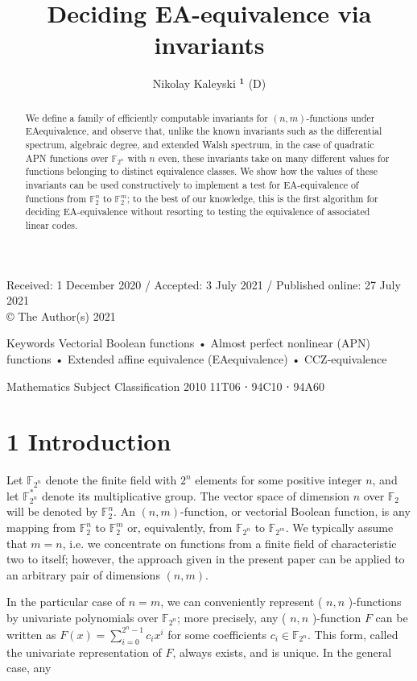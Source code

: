 \documentclass[10pt]{article}
\title{Deciding EA-equivalence via invariants }
\author{Nikolay Kaleyski ${ }^{\mathbf{1}}$ (D)}
\date{}
\begin{document}
\maketitle
\captionsetup{singlelinecheck=false}
Received: 1 December 2020 / Accepted: 3 July 2021 / Published online: 27 July 2021\\
© The Author(s) 2021

\begin{abstract}
We define a family of efficiently computable invariants for $(n, m)$-functions under EAequivalence, and observe that, unlike the known invariants such as the differential spectrum, algebraic degree, and extended Walsh spectrum, in the case of quadratic APN functions over $\mathbb{F}_{2^{n}}$ with $n$ even, these invariants take on many different values for functions belonging to distinct equivalence classes. We show how the values of these invariants can be used constructively to implement a test for EA-equivalence of functions from $\mathbb{F}_{2}^{n}$ to $\mathbb{F}_{2}^{m}$; to the best of our knowledge, this is the first algorithm for deciding EA-equivalence without resorting to testing the equivalence of associated linear codes.
\end{abstract}

Keywords Vectorial Boolean functions • Almost perfect nonlinear (APN) functions • Extended affine equivalence (EAequivalence) • CCZ-equivalence

Mathematics Subject Classification 2010 11T06 ⋅ 94C10 ⋅ 94A60

\section*{1 Introduction}
Let $\mathbb{F}_{2^{n}}$ denote the finite field with $2^{n}$ elements for some positive integer $n$, and let $\mathbb{F}_{2^{n}}^{*}$ denote its multiplicative group. The vector space of dimension $n$ over $\mathbb{F}_{2}$ will be denoted by $\mathbb{F}_{2}^{n}$. An $(n, m)$-function, or vectorial Boolean function, is any mapping from $\mathbb{F}_{2}^{n}$ to $\mathbb{F}_{2}^{m}$ or, equivalently, from $\mathbb{F}_{2^{n}}$ to $\mathbb{F}_{2^{m}}$. We typically assume that $m=n$, i.e. we concentrate on functions from a finite field of characteristic two to itself; however, the approach given in the present paper can be applied to an arbitrary pair of dimensions $(n, m)$.

In the particular case of $n=m$, we can conveniently represent ( $n, n$ )-functions by univariate polynomials over $\mathbb{F}_{2^{n}}$; more precisely, any ( $n, n$ )-function $F$ can be written as $F(x)=\sum_{i=0}^{2^{n}-1} c_{i} x^{i}$ for some coefficients $c_{i} \in \mathbb{F}_{2^{n}}$. This form, called the univariate representation of $F$, always exists, and is unique. In the general case, any
\end{document}
